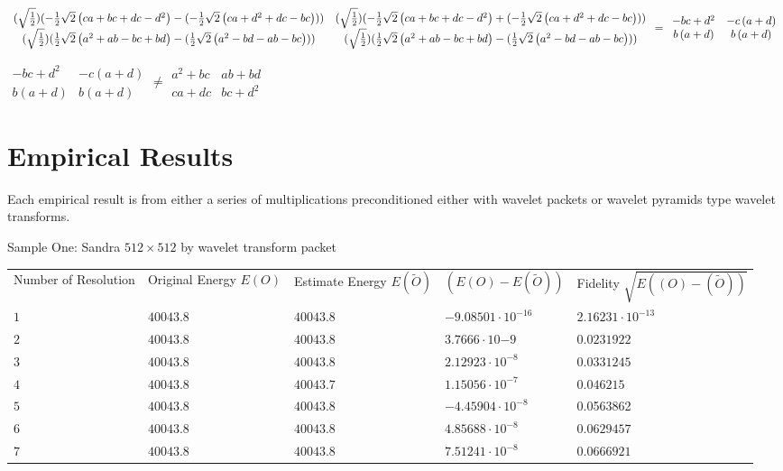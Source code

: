 \documentclass[11pt]{article}
\begin{document}
$\allowbreak 
\begin{array}{cc}
(\sqrt{\frac{1}{2}})(-\frac{1}{2}\sqrt{2}\left( ca+bc+dc-d^{2}\right) -(-%
\frac{1}{2}\sqrt{2}\left( ca+d^{2}+dc-bc\right) )) & (\sqrt{\frac{1}{2}})(-%
\frac{1}{2}\sqrt{2}\left( ca+bc+dc-d^{2}\right) +(-\frac{1}{2}\sqrt{2}\left(
ca+d^{2}+dc-bc\right) )) \\ 
(\sqrt{\frac{1}{2}})(\frac{1}{2}\sqrt{2}\left( a^{2}+ab-bc+bd\right) -(\frac{%
1}{2}\sqrt{2}\left( a^{2}-bd-ab-bc\right) )) & (\sqrt{\frac{1}{2}})(\frac{1}{%
2}\sqrt{2}\left( a^{2}+ab-bc+bd\right) -(\frac{1}{2}\sqrt{2}\left(
a^{2}-bd-ab-bc\right) ))
\end{array}
\allowbreak =\allowbreak 
\begin{array}{cc}
-bc+d^{2} & -c\left( a+d\right)  \\ 
b\left( a+d\right)  & b\left( a+d\right) 
\end{array}
$

{\tiny \bigskip }

$\allowbreak 
\begin{array}{cc}
-bc+d^{2} & -c\left( a+d\right)  \\ 
b\left( a+d\right)  & b\left( a+d\right) 
\end{array}
\neq \allowbreak 
\begin{array}{cc}
a^{2}+bc & ab+bd \\ 
ca+dc & bc+d^{2}
\end{array}
$

\section {Empirical Results}
Each empirical result is from either a series of multiplications preconditioned either with wavelet packets or wavelet pyramids type wavelet transforms.  

Sample One: Sandra $512 \times 512$ by wavelet transform packet 

\begin{tabular}{lllll}
{\tiny Number of Resolution } & \tiny {Original Energy } $E(O)$ &{\tiny Estimate Energy } $E(%
\widetilde{O})$ & $(E(O)-E(\widetilde{O}))$ & {\tiny Fidelity} $\sqrt{E((O)-(%
\widetilde{O}))}$ \\ 
$1$ & $40043.8$ &  $40043.8$ &$ -9.08501 \cdot 10^{-16} $&  $2.16231 \cdot 10^{-13}$\\ 
$2$ & $40043.8$ & $40043.8$ & $3.7666 \cdot 10{-9}$ & $0.0231922$ \\ 
$3$ & $40043.8$ & $40043.8$ & $2.12923 \cdot 10^{-8}$ & $0.0331245$  \\ 
$4$& $40043.8$  & $40043.7$  & $1.15056\cdot 10^{-7}$  & $0.046215$  \\ 
$5$& $40043.8$  & $40043.8$  & $-4.45904\cdot 10^{-8}$  & 0.0563862  \\ 
$6$& $40043.8$  & $40043.8$ & $4.85688\cdot 10^{-8}$ & $0.0629457$  \\ 
$7$& $40043.8$  & $40043.8$ & $7.51241 \cdot 10^{-8}$ & $0.0666921$  \\ 

\end{tabular}
\end{document}
